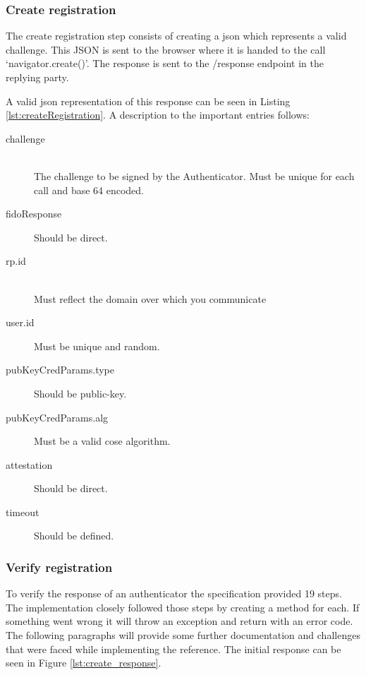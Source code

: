\documentclass[a4paper, 11pt]{scrartcl}
\begin{document}
\subsubsection{Create registration}

The create registration step consists of creating a \gls{json} which represents a valid challenge. This JSON is sent to the browser where it is handed to the call `navigator.create()'. The response is sent to the /response endpoint in the replying party.

A valid \gls{json} representation of this response can be seen in Listing \ref{lst:createRegistration}. A description to the important entries follows:



\begin{description}
  \item[challenge] \hfill \\ The challenge to be signed by the Authenticator. Must be unique for each call and base 64 encoded.
  \item[fidoResponse] Should be direct. 
  \item[rp.id] \hfill \\ Must reflect the domain over which you communicate
  \item[user.id] Must be unique and random. 
  \item[pubKeyCredParams.type] Should be public-key. 
  \item[pubKeyCredParams.alg] Must be a valid \gls{cose} algorithm. \cite{cose}
  \item[attestation] Should be direct.
  \item[timeout] Should be defined.   
\end{description}


\subsubsection{Verify registration}

To verify the response of an authenticator the specification provided 19 steps. The implementation closely followed those steps by creating a method for each. If something went wrong it will throw an exception and return with an error code. The following paragraphs will provide some further documentation and challenges that were faced while implementing the reference. The initial response can be seen in Figure \ref{lst:create_response}.
\end{document}
